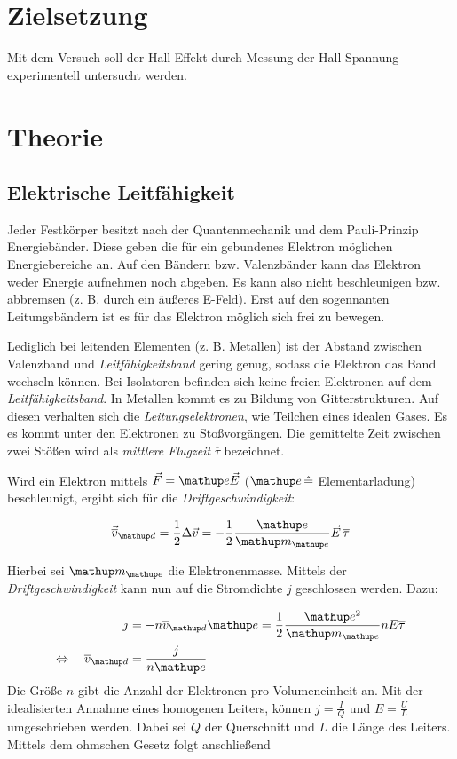 \setcounter{page}{1}
\section*{Zielsetzung}
Mit dem Versuch soll der Hall-Effekt durch Messung der
Hall-Spannung experimentell untersucht werden. %

\section{Theorie}

\subsection{Elektrische Leitfähigkeit}
Jeder Festkörper besitzt nach der Quantenmechanik und dem Pauli-Prinzip
Energiebänder.
Diese geben die für ein gebundenes Elektron möglichen Energiebereiche an. Auf den Bändern bzw. Valenzbänder kann das Elektron weder
Energie aufnehmen noch abgeben. 
Es kann also nicht beschleunigen bzw. abbremsen (z. B. durch ein äußeres E-Feld).
Erst auf den sogennanten Leitungsbändern ist es für das Elektron möglich 
sich frei zu bewegen.

Lediglich bei leitenden Elementen (z. B. Metallen) ist der Abstand zwischen Valenzband und \emph{Leitfähigkeitsband} gering genug, sodass die Elektron das Band
wechseln können. 
Bei Isolatoren befinden sich keine freien Elektronen auf dem \emph{Leitfähigkeitsband}.
In Metallen kommt es zu Bildung von Gitterstrukturen.
Auf diesen verhalten sich die \emph{Leitungselektronen}, wie Teilchen eines idealen Gases.
Es es kommt unter den Elektronen zu Stoßvorgängen.
Die gemittelte Zeit zwischen zwei Stößen wird als \emph{mittlere Flugzeit} $\overline{\tau}$ bezeichnet.

Wird ein Elektron mittels $\vec{F}=\map{e}\vec{E}$ ($\map{e}\, \hat{=}$ Elementarladung) beschleunigt, %
ergibt sich für die \emph{Driftgeschwindigkeit}: %

\begin{equation}
\label{eq:drift_v}
\vec{\overline{v}}\ua{d}=\frac{1}{2}\Delta\vec{v}=-\frac{1}{2}\frac{\map{e}}{\map{m}\ua{e}}\vec{E}\,\overline{\tau}
\end{equation}

Hierbei sei $\map{m}\ua{e}$ die Elektronenmasse.
Mittels der \emph{Driftgeschwindigkeit} kann nun auf die Stromdichte $j$ geschlossen werden. Dazu:

\begin{align}
j&=-n\overline{v}\ua{d}\map{e}=\frac{1}{2}\frac{\map{e^2}}{\map{m}\ua{e}}n E\overline{\tau}\notag \\
\Leftrightarrow \quad \overline{v}\ua{d}&=\frac{j}{n\map{e}}\label{eq:stromdicht}
\end{align}
Die Größe $n$ gibt die Anzahl der Elektronen pro Volumeneinheit an.
Mit der idealisierten Annahme eines homogenen Leiters, können %
$j=\frac{I}{Q}$ und $E=\frac{U}{L}$ umgeschrieben werden.
Dabei sei $Q$ der Querschnitt und $L$ die Länge des Leiters.
Mittels dem ohmschen Gesetz folgt anschließend

